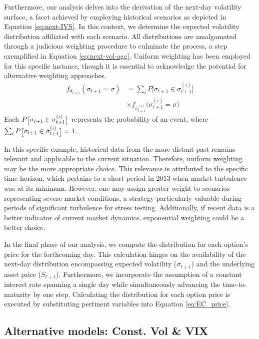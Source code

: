 Furthermore, our analysis delves into the derivation of the next-day volatility surface, a facet achieved by employing historical scenarios as depicted in Equation \eqref{eq:next-IVS}. In this context, we determine the expected volatility distribution affiliated with each scenario. All distributions are amalgamated through a judicious weighting procedure to culminate the process, a step exemplified in Equation \eqref{eq:next-vol-agg}. Uniform weighting has been employed for this specific instance, though it is essential to acknowledge the potential for alternative weighting approaches.
\begin{align}
    f_{\sigma_{t+1}}(\sigma_{t+1} = \sigma) &= \sum_{i}P\Big[\sigma_{t+1} \in \sigma_{t+1}^{(i)}\Big] \nonumber\\ 
    &\times f_{\sigma_{t+1}^{(i)}}\Big(\sigma_{t+1}^{(i)} = \sigma\Big)\label{eq:next-vol-agg}
\end{align}
Each $\tiny P\Big[\sigma_{t+1} \in \sigma_{t+1}^{(i)}\Big]$ represents the probability of an event, where $\tiny\sum_{i}P\Big[\sigma_{t+1} \in \sigma_{t+1}^{(i)}\Big]=1$.

In this specific example, historical data from the more distant past remains relevant and applicable to the current situation. Therefore, uniform weighting may be the more appropriate choice. This relevance is attributed to the specific time horizon, which pertains to a short period in 2013 when market turbulence was at its minimum. However, one may assign greater weight to scenarios representing severe market conditions, a strategy particularly valuable during periods of significant turbulence for stress testing. Additionally, if recent data is a better indicator of current market dynamics, exponential weighting could be a better choice.

In the final phase of our analysis, we compute the distribution for each option's price for the forthcoming day. This calculation hinges on the availability of the next-day distribution encompassing expected volatility ($\sigma_{t+1}$) and the underlying asset price ($S_{t+1}$). Furthermore, we incorporate the assumption of a constant interest rate spanning a single day while simultaneously advancing the time-to-maturity by one step. Calculating the distribution for each option price is executed by substituting pertinent variables into Equation \eqref{eq:EC_price}.

\subsection{Alternative models: Const. Vol \& VIX}\label{sec:alternatives}


